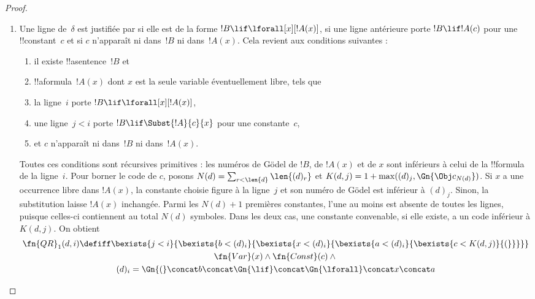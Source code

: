\documentclass[../../../include/open-logic-section]{subfiles}
\begin{document}
\begin{proof}
\begin{enumerate}
  porte $!A \lif !B$ et la ligne~$i$ porte~$!B$.
  \begin{multline*}
    \fn{MP}(d, i) \defiff \bexists{j < i}{\bexists{k < i}{}}\\
    (d)_k = \Gn{(} \concat (d)_j
      \concat \Gn{\lif} \concat (d)_i \concat \Gn{)}
  \end{multline*}
  La quantification bornée, la concaténation et l'égalité étant
  récursives primitives, cette formule définit une relation
  récursive primitive.
\item Une ligne de~$\delta$ est justifiée par \QR{} si elle est de
  la forme $!B \lif \lforall[x][!A(x)]$, si une ligne antérieure
  porte $!B \lif !A(c)$ pour une !!{constant}~$c$ et si $c$
  n'apparaît ni dans~$!B$ ni dans~$!A(x)$. Cela revient aux conditions suivantes :
  \begin{enumerate}
  \item il existe !!a{sentence}~$!B$ et
  \item !!a{formula}~$!A(x)$ dont $x$ est la seule variable
    éventuellement libre, tels que
  \item la ligne~$i$ porte $!B \lif \lforall[x][!A(x)]$,
  \item une ligne~$j<i$ porte $!B \lif \Subst{!A}{c}{x}$ pour une
    constante~$c$,
  \item et $c$ n'apparaît ni dans~$!B$ ni dans~$!A(x)$.
  \end{enumerate}
  Toutes ces conditions sont récursives primitives : les numéros
  de G\"odel de $!B$, de $!A(x)$ et de $x$ sont inférieurs à celui
  de la !!{formula} de la ligne~$i$. Pour borner le code de $c$,
  posons $N(d)=\sum_{r<\len{d}}\len{(d)_r}$ et
  $K(d,j)=1+\max((d)_j,\Gn{\Obj c_{N(d)}})$. Si $x$ a une occurrence
  libre dans $!A(x)$, la constante choisie figure à la ligne~$j$ et son
  numéro de G\"odel est inférieur à $(d)_j$. Sinon, la substitution
  laisse $!A(x)$ inchangée. Parmi les $N(d)+1$ premières constantes,
  l'une au moins est absente de toutes les lignes, puisque celles-ci
  contiennent au total $N(d)$ symboles. Dans les deux cas, une
  constante convenable, si elle existe, a un code inférieur à $K(d,j)$.
  On obtient
  \begin{multline*}
    \fn{QR}_1(d, i) \defiff \bexists{j < i}{\bexists{b < (d)_i}{\bexists{x <
        (d)_i}{\bexists{a < (d)_i}{\bexists{c < K(d,j)}{(}}}}}
    \\ \fn{Var}(x) \land \fn{Const}(c) \land {} \\
    (d)_i = \Gn{(} \concat
    b \concat \Gn{\lif} \concat \Gn{\lforall} \concat x \concat a

\end{multline*}
\end{enumerate}
\end{proof}
\end{document}
